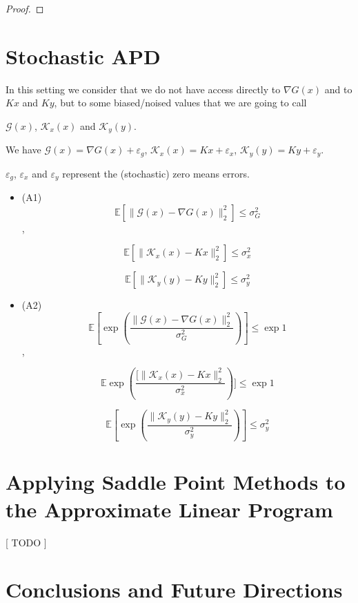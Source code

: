 \documentclass[12pt,reqno]{amsart}
\numberwithin{equation}{section}
\begin{document}
\begin{proof}

\end{proof}

\section{Stochastic APD}

In this setting we consider that we do not have access directly to $\nabla G(x)$ and to $Kx$ and $Ky$, but to some biased/noised values that we are going to call

$\mathcal{G}(x)$, $\mathcal{K}_{x}(x)$ and $\mathcal{K}_{y}(y)$.

We have $\mathcal{G}(x) = \nabla G(x) + \varepsilon_{g}$, $\mathcal{K}_{x}(x) = Kx + \varepsilon_{x}$, $\mathcal{K}_{y}(y) = Ky + \varepsilon_{y}$.

$\varepsilon_{g}$, $\varepsilon_{x}$ and $\varepsilon_{y}$ represent the (stochastic) zero means errors.


\begin{itemize}


\item (A1) $$\mathbb{E}[\lVert \mathcal{G}(x) - \nabla G(x) \rVert_{2}^{2}] \leq \sigma_{G}^{2}$$,

$$\mathbb{E}[\lVert \mathcal{K}_{x}(x) - Kx \rVert_{2}^{2}] \leq \sigma_{x}^{2}$$

$$\mathbb{E}[\lVert \mathcal{K}_{y}(y) - Ky \rVert_{2}^{2}] \leq \sigma_{y}^{2}$$

\item (A2) $$\mathbb{E}[\exp(\frac{\lVert \mathcal{G}(x) - \nabla G(x) \rVert_{2}^{2}}{\sigma_{G}^{2}})] \leq \exp{1}$$,

$$\mathbb{E}\exp(\frac{[\lVert \mathcal{K}_{x}(x) - Kx \rVert_{2}^{2}}{\sigma_{x}^{2}})] \leq \exp{1}$$

$$\mathbb{E}[\exp(\dfrac{\lVert \mathcal{K}_{y}(y) - Ky \rVert_{2}^{2}}{\sigma_{y}^{2}})] \leq \sigma_{y}^{2}$$
\end{itemize}


\section{Applying Saddle Point Methods to the Approximate Linear Program}

[ TODO ]

\section{Conclusions and Future Directions}
\end{document}
